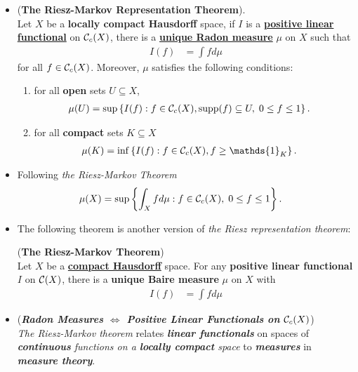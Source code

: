 \documentclass[11pt]{article}
\begin{document}
\begin{itemize}
\item \begin{theorem} (\textbf{The Riesz-Markov Representation Theorem}). \citep{folland2013real}\\
Let $X$ be a \textbf{locally compact Hausdorff} space, if $I$ is a \underline{\textbf{positive linear functional}} on \underline{${\mathcal C}_{c}(X)$}, there is a \underline{\textbf{unique Radon measure}} $\mu$ on $X$ such that
\begin{align*}
I(f) &= \int f d\mu 
\end{align*}
for all $f \in {\mathcal C}_{c}(X)$. Moreover, $\mu$ satisfies the following conditions:
\begin{enumerate}
\item for all \textbf{open} sets $U \subseteq X$,
\begin{align*}
\mu(U) &= \sup\left\{I(f): f \in {\mathcal C}_c(X), \text{supp}(f) \subseteq U, \; 0 \le f \le 1\right\}.
\end{align*} 
\item for all \textbf{compact} sets $K \subseteq X$
\begin{align*}
\mu(K) &= \inf\set{I(f): f \in \cC_c(X), f \ge \mathds{1}_{K}}.
\end{align*}
\end{enumerate}
\end{theorem}

\item \begin{remark}
Following \emph{the Riesz-Markov Theorem}
\begin{align*}
\mu(X) &= \sup\left\{\int_X f d\mu: f \in {\mathcal C}_c(X),  \; 0 \le f \le 1\right\}.
\end{align*}
\end{remark}

\item The following theorem is another version of \emph{the Riesz representation theorem}:
 \begin{theorem} (\textbf{The Riesz-Markov Theorem}) \citep{reed1980methods}\\
Let $X$ be a \underline{\textbf{compact Hausdorff}} space. For any \textbf{positive linear functional} $I$ on \underline{${\mathcal C}(X)$}, there is a \textbf{unique Baire measure} $\mu$ on $X$ with 
\begin{align*}
I(f) &= \int f d\mu 
\end{align*} 
\end{theorem}

\item \begin{remark} (\emph{\textbf{Radon Measures $\Leftrightarrow$ Positive Linear Functionals on ${\mathcal C}_c(X)$}})\\
\emph{The Riesz-Markov theorem} relates \emph{\textbf{linear functionals}} on spaces of \emph{\textbf{continuous} functions on a \textbf{locally compact} space} to \emph{\textbf{measures}} in \textbf{\emph{measure theory}}. 
\end{remark}


\end{itemize}
\end{document}
